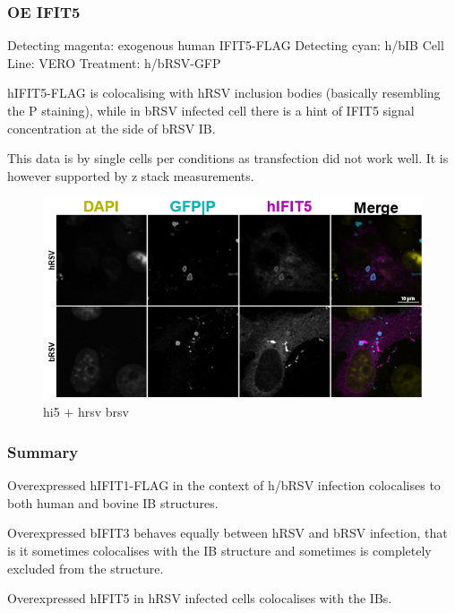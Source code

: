 \subsubsection{OE IFIT5}
Detecting magenta: exogenous human IFIT5-FLAG \newline
Detecting cyan: h/bIB \newline
Cell Line: VERO \newline
Treatment: h/bRSV-GFP \newline

hIFIT5-FLAG is colocalising with hRSV inclusion bodies (basically resembling the P staining), while in bRSV infected cell there is a hint of IFIT5 signal concentration at the side of bRSV IB.

This data is by single cells per conditions as transfection did not work well. It is however supported by z stack measurements.


\begin{figure}
    \centering
    \includegraphics[width=1\linewidth]{09. Chapter 4/Figs/04. Overexpression/04. hi5-hrsv-brsv.png}
    \caption[hi5 + hrsv brsv]{hi5 + hrsv brsv}
    \label{fig:hi5 + hrsv brsv}
\end{figure}


\subsubsection{Summary} \label{Summary-oe}
Overexpressed hIFIT1-FLAG in the context of h/bRSV infection colocalises to both human and bovine IB structures.

Overexpressed bIFIT3 behaves equally between hRSV and bRSV infection, that is it sometimes colocalises with the IB structure and sometimes is completely excluded from the structure.

Overexpressed hIFIT5 in hRSV infected cells colocalises with the IBs.